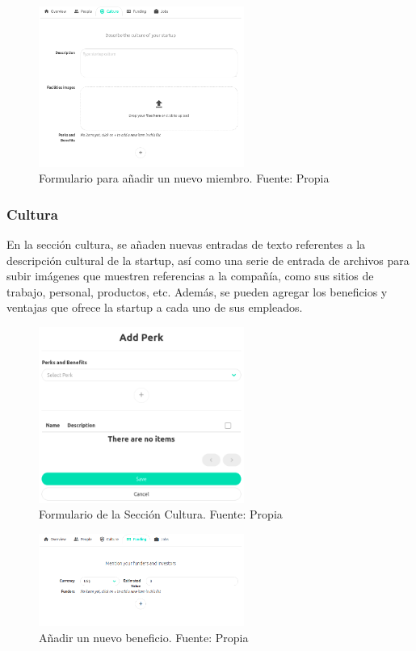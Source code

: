 \begin{figure}[H]
\centering
\includegraphics[width=0.60\textwidth]{img/40.png}
\caption{Formulario para añadir un nuevo miembro. Fuente: Propia}
\label{figure:startupsAddMember}
\end{figure}

\subsubsection{Cultura}

En la sección cultura, se añaden nuevas entradas de texto referentes a la descripción cultural de la startup, así como una serie de entrada de archivos para subir imágenes que muestren referencias a la compañía, como sus sitios de trabajo, personal, productos, etc. Además, se pueden agregar los beneficios y ventajas que ofrece la startup a cada uno de sus empleados.

\begin{figure}[H]
\centering
\includegraphics[width=0.60\textwidth]{img/41.png}
\caption{Formulario de la Sección Cultura. Fuente: Propia}
\label{figure:startupsCulture}
\end{figure}


\begin{figure}[H]
\centering
\includegraphics[width=0.60\textwidth]{img/42.png}
\caption{
Añadir un nuevo beneficio. Fuente: Propia}
\label{figure:startupsPerk}
\end{figure}

